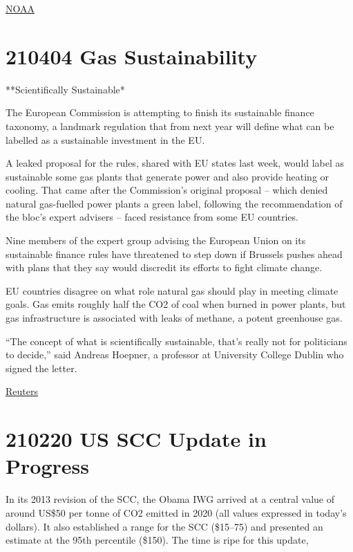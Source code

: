 \documentclass[
]{book}
\begin{document}
\href{https://research.noaa.gov/article/ArtMID/587/ArticleID/2742/Despite-pandemic-shutdowns-carbon-dioxide-and-methane-surged-in-2020}{NOAA}

\hypertarget{gas-sustainability}{%
\section{210404 Gas Sustainability}\label{gas-sustainability}}

**Scientifically Sustainable*

The European Commission is attempting to finish its sustainable finance taxonomy, a landmark regulation that from next year will define what can be labelled as a sustainable investment in the EU.

A leaked proposal for the rules, shared with EU states last week, would label as sustainable some gas plants that generate power and also provide heating or cooling. That came after the Commission's original proposal -- which denied natural gas-fuelled power plants a green label, following the recommendation of the bloc's expert advisers -- faced resistance from some EU countries.

Nine members of the expert group advising the European Union on its sustainable finance rules have threatened to step down if Brussels pushes ahead with plans that they say would discredit its efforts to fight climate change.

EU countries disagree on what role natural gas should play in meeting climate goals. Gas emits roughly half the CO2 of coal when burned in power plants, but gas infrastructure is associated with leaks of methane, a potent greenhouse gas.

``The concept of what is scientifically sustainable, that's really not for politicians to decide,'' said Andreas Hoepner, a professor at University College Dublin who signed the letter.

\href{https://www.reuters.com/article/europe-regulations-finance/nine-eu-advisers-threaten-walkout-over-sustainable-finance-row-idUSL4N2LT4LJ}{Reuters}

\hypertarget{us-scc-update-in-progress}{%
\section{210220 US SCC Update in Progress}\label{us-scc-update-in-progress}}

In its 2013 revision of the SCC, the Obama IWG arrived at a central value of around US\$50 per tonne of CO2 emitted in 2020 (all values expressed in today's dollars). It also established a range for the SCC (\$15--75) and presented an estimate at the 95th percentile (\$150).
The time is ripe for this update,
\end{document}
